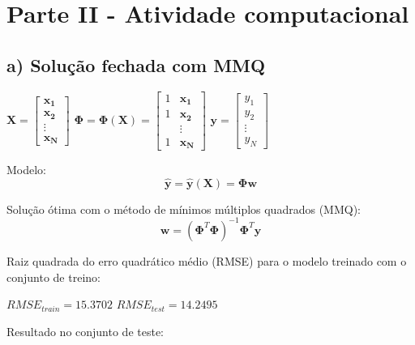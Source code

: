 \documentclass[a4paper, 12pt]{article}
\begin{document}
\newpage

\section*{Parte II - Atividade computacional}

\subsection*{a) Solução fechada com MMQ}

$
\mathbf{X} =\begin{bmatrix}
    \mathbf{x_1} \\
    \mathbf{x_2} \\
    \vdots \\
    \mathbf{x_N}
\end{bmatrix}
$
\hspace{2em}
$
\boldsymbol{\Phi} = \boldsymbol{\Phi}(\mathbf{X}) = \begin{bmatrix}
    1 & \mathbf{x_1} \\
    1 & \mathbf{x_2} \\
    &\vdots \\
    1 & \mathbf{x_N}
\end{bmatrix}
$
\hspace{2em}
$
\mathbf{y} =\begin{bmatrix}
    y_1 \\
    y_2 \\
    \vdots \\
    y_N
\end{bmatrix}
$

\vspace{1em}

Modelo:
\begin{equation}
    \mathbf{\hat{y}} = \mathbf{\hat{y}}(\mathbf{X}) = \boldsymbol{\Phi}\mathbf{w}
\end{equation}

Solução ótima com o método de mínimos múltiplos quadrados (MMQ):
\begin{equation}
    \mathbf{w} = (\boldsymbol{\Phi}^T\boldsymbol{\Phi})^{-1}\boldsymbol{\Phi}^T\mathbf{y}
\end{equation}

Raiz quadrada do erro quadrático médio (RMSE) para o modelo treinado com o conjunto de treino:

$ RMSE _{train} = 15.3702$
\hspace{2em}
$ RMSE _{test} = 14.2495$

Resultado no conjunto de teste:
\end{document}
